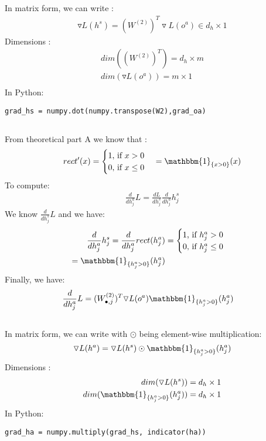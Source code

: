 \documentclass[12pt]{article}
\begin{document}
\subsection{}
In matrix form, we can write :
\begin{align*}
\triangledown L(h^s) =(W^{(2)})^T  \triangledown L(o^a) \in d_h \times 1
\end{align*}
Dimensions :
\begin{align*}
dim((W^{(2)})^T ) = d_h \times m \\
dim(\triangledown L(o^a)) = m \times 1 \\
\end{align*}
In Python:
\begin{lstlisting}
grad_hs = numpy.dot(numpy.transpose(W2),grad_oa)
\end{lstlisting}
\subsection{}
From theoretical part A we know that :
\begin{align*}
rect'(x) = \begin{cases}
               1$, if $ x > 0 \\
               0$, if $ x \leq 0  \\
            \end{cases} = \mathbbm{1}_{\{x>0\}}(x)
\end{align*}
To compute: 
\begin{align*}
\frac{d}{dh^a_j} L =\frac{dL}{dh_j^s} \frac{d}{dh^a_j} h_j^s
\end{align*}
We know $\frac{d}{dh^s_j} L$ and we have:
\begin{align*}
\frac{d}{dh^a_j} {h^s_j} = \frac{d}{dh^a_j} {rect(h^a_j)} &=  \begin{cases}
               1$, if $ h^a_j > 0 \\
               0$, if $ h^a_j \leq 0  \\
            \end{cases}  \\ = \mathbbm{1}_{\{h^a_j>0\}}(h^a_j)
\end{align*}
Finally, we have:
\begin{align*}
\frac{d}{dh^a_j} L & = (W^{(2)}_{\bullet,j})^T \triangledown L(o^a)  \mathbbm{1}_{\{h^a_j>0\}}(h^a_j)
\end{align*}
\subsection{}
In matrix form, we can write with $\odot$ being element-wise multiplication:
\begin{align*}
\triangledown L(h^a) = \triangledown L(h^s) \odot \mathbbm{1}_{\{h^a_j>0\}}(h^a_j) 
\end{align*}
Dimensions :
\begin{align*}
dim(\triangledown L(h^s)) = d_h \times 1 \\
dim(\mathbbm{1}_{\{h^a_j>0\}}(h^a_j)) = d_h \times 1 \\
\end{align*}
In Python:
\begin{lstlisting}
grad_ha = numpy.multiply(grad_hs, indicator(ha))
\end{lstlisting}
\end{document}
